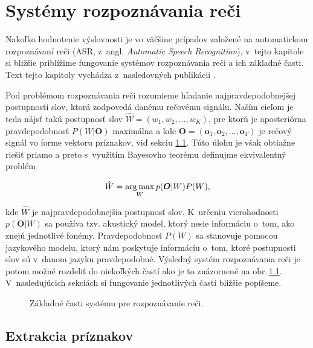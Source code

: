 \chapter{Systémy rozpoznávania reči} \label{cha:asr-systems}

Nakoľko hodnotenie výslovnosti je vo väčšine prípadov založené na automatickom rozpoznávaní reči (ASR, z~angl. \textit{Automatic Speech Recognition}), v~tejto kapitole si bližšie priblížime fungovanie systémov rozpoznávania reči a ich základné časti. Text tejto kapitoly vychádza z~nasledovných publikácii \cite{Psutka2006, Gales2007, Young2015, Dong2015}.

Pod problémom rozpoznávania reči rozumieme hľadanie najpravdepodobnejšej postupnosti slov, ktorá zodpovedá danému rečovému signálu. Naším cieľom je teda nájsť takú postupnosť slov $\hat{W} = (w_1, w_2, \dots, w_K)$, pre ktorú je aposteriórna pravdepodobnosť $P(W | \bm{O})$ maximálna a kde $\textbf{O} = (\bm{o}_1, \bm{o}_2, \dots, \bm{o}_T)$ je rečový signál vo forme vektoru príznakov, viď sekciu \ref{sec:feature-extraction}. Túto úlohu je však obtiažne riešiť priamo a preto s~využitím Bayesovho teorému definujme ekvivalentný problém

\begin{equation}
    \hat{W} = \operatorname*{arg\,max}_W p(\bm{O} | W) P(W), \label{eq:asr-max-word-sequence}
\end{equation}

\noindent kde $\hat{W}$ je najpravdepodobnejšia postupnosť slov. K~určeniu vierohodnosti $p(\bm{O} | W)$ sa používa tzv. akustický model, ktorý nesie informáciu o~tom, ako znejú jednotlivé fonémy. Pravdepodobnosť $P(W)$ sa stanovuje pomocou jazykového modelu, ktorý nám poskytuje informáciu o~tom, ktoré postupnosti slov sú v~danom jazyku pravdepodobné.
Výsledný systém rozpoznávania reči je potom možné rozdeliť do niekoľkých častí ako je to znázornené na obr.\,\ref{fig:asr-diagram}. V~nasledujúcich sekciách si fungovanie jednotlivých častí bližšie popíšeme.

\begin{figure}
    \centering
    
    \caption{Základné časti systému pre rozpoznávanie reči.}
    \label{fig:asr-diagram}

\end{figure}

\section{Extrakcia príznakov} \label{sec:feature-extraction}

